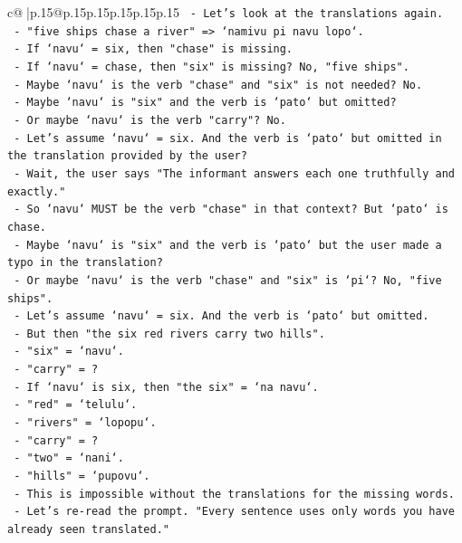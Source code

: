 \documentclass{article}
\begin{document}
{\begin{supertabular}{c@{$\;$}|p{.15\linewidth}@{}p{.15\linewidth}p{.15\linewidth}p{.15\linewidth}p{.15\linewidth}p{.15\linewidth}}
{{{\texttt{    {-} Let's look at the translations again.} \\
\texttt{    {-} "five ships chase a river" => `namivu pi navu lopo`.} \\
\texttt{      {-} If `navu` = six, then "chase" is missing.} \\
\texttt{      {-} If `navu` = chase, then "six" is missing? No, "five ships".} \\
\texttt{      {-} Maybe `navu` is the verb "chase" and "six" is not needed? No.} \\
\texttt{      {-} Maybe `navu` is "six" and the verb is `pato` but omitted?} \\
\texttt{      {-} Or maybe `navu` is the verb "carry"? No.} \\
\texttt{      {-} Let's assume `navu` = six. And the verb is `pato` but omitted in the translation provided by the user?} \\
\texttt{      {-} Wait, the user says "The informant answers each one truthfully and exactly."} \\
\texttt{      {-} So `navu` MUST be the verb "chase" in that context? But `pato` is chase.} \\
\texttt{      {-} Maybe `navu` is "six" and the verb is `pato` but the user made a typo in the translation?} \\
\texttt{      {-} Or maybe `navu` is the verb "chase" and "six" is `pi`? No, "five ships".} \\
\texttt{      {-} Let's assume `navu` = six. And the verb is `pato` but omitted.} \\
\texttt{      {-} But then "the six red rivers carry two hills".} \\
\texttt{      {-} "six" = `navu`.} \\
\texttt{      {-} "carry" = ?} \\
\texttt{      {-} If `navu` is six, then "the six" = `na navu`.} \\
\texttt{      {-} "red" = `telulu`.} \\
\texttt{      {-} "rivers" = `lopopu`.} \\
\texttt{      {-} "carry" = ?} \\
\texttt{      {-} "two" = `nani`.} \\
\texttt{      {-} "hills" = `pupovu`.} \\
\texttt{  {-} This is impossible without the translations for the missing words.} \\
\texttt{  {-} Let's re{-}read the prompt. "Every sentence uses only words you have already seen translated."} \\
}}}
\end{supertabular}}
\end{document}
